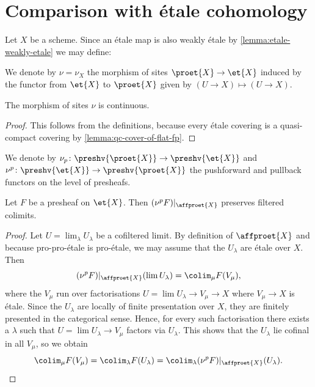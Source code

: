 \section{Comparison with étale cohomology}

Let $X$ be a scheme. Since an étale map is also weakly étale by \ref{lemma:etale-weakly-etale} we may
define:

\begin{definition}
    We denote by $\nu = \nu_X$ the morphism of sites $\proet{X} \to \et{X}$ induced by the functor
    from $\et{X}$ to $\proet{X}$ given by $(U \to X) \mapsto (U \to X)$.
    \label{def:forget-proet}
    \leanok
\end{definition}

\begin{lemma}
    The morphism of sites $\nu$ is continuous.
    \label{lemma:forget-proet-continuous}
    \leanok
\end{lemma}

\begin{proof}
    \leanok
    This follows from the definitions, because every étale covering is
    a quasi-compact covering by \ref{lemma:qc-cover-of-flat-fp}.
\end{proof}

We denote by $\nu_{p}\colon \preshv{\proet{X}} \to \preshv{\et{X}}$
and $\nu^{p}\colon \preshv{\et{X}} \to \preshv{\proet{X}}$ the pushforward and pullback functors
on the level of presheafs.

\begin{lemma}
    Let $F$ be a presheaf on $\et{X}$. Then $(\nu^p F)|_{\affproet{X}}$ preserves
    filtered colimits.
    \label{lemma:affproet-pushforward-presheaf-filtered-colim}
    \leanok
\end{lemma}

\begin{proof}
    Let $U = \lim_{\lambda} U_{\lambda}$ be a cofiltered limit. By definition
    of $\affproet{X}$ and because pro-pro-étale is pro-étale, we may assume that the $U_{\lambda}$
    are étale over $X$. Then
    \[
        (\nu^p F)|_{\affproet{X}}(\lim U_{\lambda})
        = \colim_{\mu} F(V_{\mu})
    ,\] where the $V_{\mu}$ run over factorisations
    $U = \lim U_{\lambda} \to V_{\mu} \to X$
    where $V_{\mu} \to X$ is étale. Since the $U_{\lambda}$ are
    locally of finite presentation over $X$, they are finitely presented
    in the categorical sense. Hence, for every such factorisation there
    exists a $\lambda$ such that $U = \lim U_{\lambda} \to V_{\mu}$ factors
    via $U_{\lambda}$. This shows that the $U_{\lambda}$ lie cofinal
    in all $V_{\mu}$, so we obtain
    \[
    \colim_{\mu} F(V_{\mu}) = \colim_{\lambda} F(U_{\lambda})
    = \colim_{\lambda} (\nu^p F)|_{\affproet{X}}(U_{\lambda})
    .\]
\end{proof}

